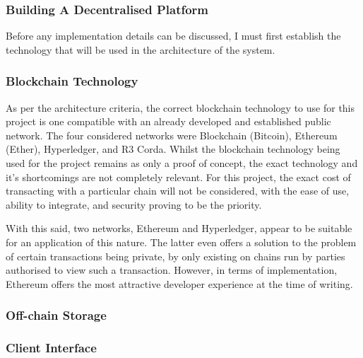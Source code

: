 \subsubsection{Building A Decentralised Platform}

Before any implementation details can be discussed, I must first establish the technology that will be used in the architecture of the system.

\subsubsection{Blockchain Technology}

As per the architecture criteria, the correct blockchain technology to use for this project is one compatible with an already developed and established public network. The four considered networks were Blockchain (Bitcoin), Ethereum (Ether), Hyperledger, and R3 Corda. Whilst the blockchain technology being used for the project remains as only a proof of concept, the exact technology and it's shortcomings are not completely relevant. For this project, the exact cost of transacting with a particular chain will not be considered, with the ease of use, ability to integrate, and security proving to be the priority.

With this said, two networks, Ethereum and Hyperledger, appear to be suitable for an application of this nature. The latter even offers a solution to the problem of certain transactions being private, by only existing on chains run by parties authorised to view such a transaction. However, in terms of implementation, Ethereum offers the most attractive developer experience at the time of writing.



\subsubsection{Off-chain Storage}

\subsubsection{Client Interface}



